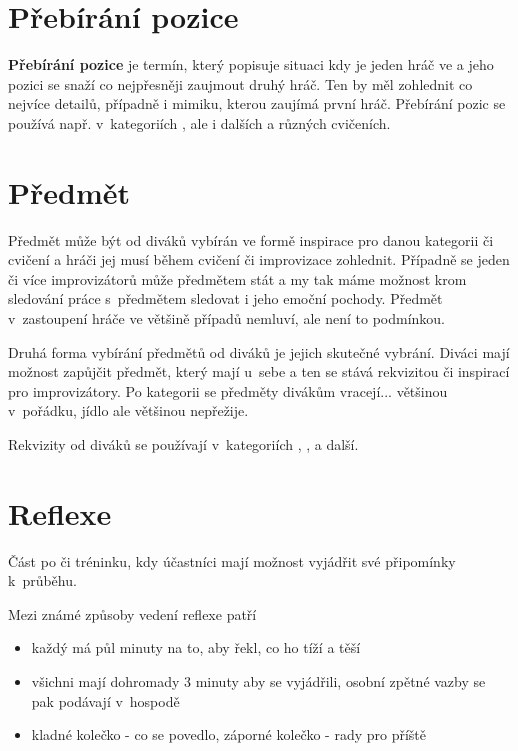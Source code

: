 
\needspace{5cm} \section{Přebírání pozice} \label{přebírání pozice} \textbf{Přebírání pozice} je termín, který popisuje situaci kdy je jeden hráč ve  a jeho pozici se snaží co nejpřesněji zaujmout druhý hráč. Ten by měl zohlednit co nejvíce detailů, případně i mimiku, kterou zaujímá první hráč. Přebírání pozic se používá např. v~kategoriích ,  ale i dalších a různých cvičeních. 
 
 
\needspace{5cm} \section{Předmět} \label{předmět} Předmět může být od diváků vybírán ve formě inspirace pro danou kategorii či cvičení a hráči jej musí během cvičení či improvizace zohlednit. Případně se jeden či více improvizátorů může předmětem stát a my tak máme možnost krom sledování práce s~předmětem sledovat i jeho emoční pochody. Předmět v~zastoupení hráče ve většině případů nemluví, ale není to podmínkou. 
 
Druhá forma vybírání předmětů od diváků je jejich skutečné vybrání. Diváci mají možnost zapůjčit předmět, který mají u~sebe a ten se stává rekvizitou či inspirací pro improvizátory. Po kategorii se předměty divákům vracejí... většinou v~pořádku, jídlo ale většinou nepřežije. 
 
Rekvizity od diváků se používají v~kategoriích , , a další. 
 
 
\needspace{5cm} \section{Reflexe} \label{reflexe} Část po  či tréninku, kdy účastníci mají možnost vyjádřit své připomínky k~průběhu. 
 
Mezi známé způsoby vedení reflexe patří 
\begin{itemize}
\item každý má půl minuty na to, aby řekl, co ho tíží a těší
\item všichni mají dohromady 3 minuty aby se vyjádřili, osobní zpětné vazby se pak podávají v~hospodě
\item kladné kolečko - co se povedlo, záporné kolečko - rady pro příště
\end{itemize}
 
